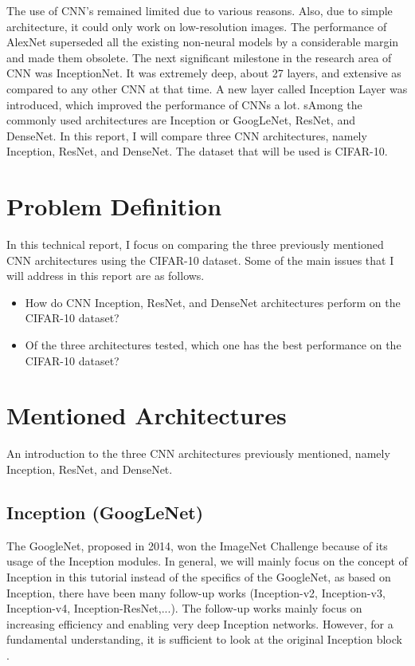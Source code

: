 \documentclass[peerreview]{IEEEtran}
\begin{document}
The use of CNN's remained limited due to various reasons. Also, due to simple architecture, it could only work on low-resolution images. The performance of AlexNet superseded all the existing non-neural models by a considerable margin and made them obsolete. The next significant milestone in the research area of CNN was InceptionNet. It was extremely deep, about 27 layers, and extensive as compared to any other CNN at that time. A new layer called Inception Layer was introduced, which improved the performance of CNNs a lot. sAmong the commonly used architectures are Inception or GoogLeNet, ResNet, and DenseNet. In this report, I will compare three CNN architectures, namely Inception, ResNet, and DenseNet. The dataset that will be used is CIFAR-10.

\section{Problem Definition}
In this technical report, I focus on comparing the three previously mentioned CNN architectures using the CIFAR-10 dataset. Some of the main issues that I will address in this report are as follows.
\begin{itemize}
  \item How do CNN Inception, ResNet, and DenseNet architectures perform on the CIFAR-10 dataset?
  \item Of the three architectures tested, which one has the best performance on the CIFAR-10 dataset?
\end{itemize}


\section{Mentioned Architectures}
An introduction to the three CNN architectures previously mentioned, namely Inception, ResNet, and DenseNet.

\subsection{Inception (GoogLeNet)}
The GoogleNet, proposed in 2014, won the ImageNet Challenge because of its usage of the Inception modules. In general, we will mainly focus on the concept of Inception in this tutorial instead of the specifics of the GoogleNet, as based on Inception, there have been many follow-up works (Inception-v2, Inception-v3, Inception-v4, Inception-ResNet,...). The follow-up works mainly focus on increasing efficiency and enabling very deep Inception networks. However, for a fundamental understanding, it is sufficient to look at the original Inception block \cite{szegedy2014going}.
\end{document}
